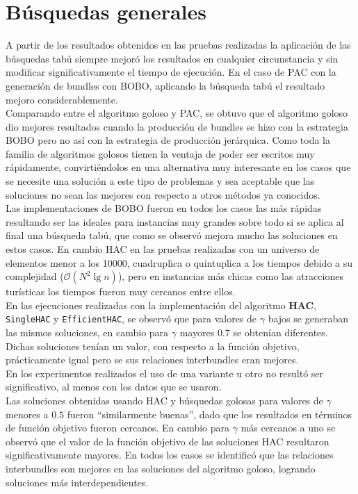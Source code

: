 \section{Búsquedas generales}
A partir de los resultados obtenidos en las pruebas realizadas la aplicación de las búsquedas tabú siempre mejoró los resultados en cualquier circunstancia y sin modificar significativamente el tiempo de ejecución. En el caso de PAC con la generación de bundles con BOBO, aplicando la búsqueda tabú el resultado mejoro considerablemente.\\
Comparando entre el algoritmo goloso y PAC, se obtuvo que el algoritmo goloso dio mejores resultados cuando la producción de bundles se hizo con la estrategia BOBO pero no así con la estrategia de producción jerárquica. Como toda la familia de algoritmos golosos tienen la ventaja de poder ser escritos muy rápidamente, convirtiéndolos en una alternativa muy interesante en los casos que se necesite una solución a este tipo de problemas y sea aceptable que las soluciones no sean las mejores con respecto a otros métodos ya conocidos.\\
Las implementaciones de BOBO fueron en todos los casos las más rápidas resultando ser las ideales para instancias muy grandes sobre todo si se aplica al final una búsqueda tabú, que como se observó mejora mucho las soluciones en estos casos. En cambio HAC en las pruebas realizadas con un universo de elementos menor a los 10000, cuadruplica o quintuplica a los tiempos debido a su complejidad ($\mathcal{O}(N^{2}\lg n)$), pero en instancias más chicas como las atracciones turísticas los tiempos fueron muy cercanos entre ellos.\\
En las ejecuciones realizadas con la implementación del algoritmo \textbf{HAC}, \texttt{SingleHAC} y \texttt{EfficientHAC}, se observó que para valores de $\gamma$ bajos se generaban las mismos soluciones, en cambio para $\gamma$ mayores $0.7$ se obtenían diferentes. Dichas soluciones tenían un valor, con respecto a la función objetivo, prácticamente igual pero se sus relaciones interbundles eran mejores.\\
En los experimentos realizados el uso de una variante u otro no resultó ser significativo, al menos con los datos que se usaron.\\
Las soluciones obtenidas usando HAC y búsquedas golosas para valores de $\gamma$ menores a $0.5$ fueron \textquotedblleft similarmente buenas\textquotedblright , dado que los resultados en términos de función objetivo fueron cercanos. En cambio para $\gamma$ más cercanos a uno se observó que el valor de la función objetivo de las soluciones HAC resultaron significativamente mayores. En todos los casos se identificó que las relaciones interbundles son mejores en las soluciones del algoritmo goloso, logrando soluciones más interdependientes.

